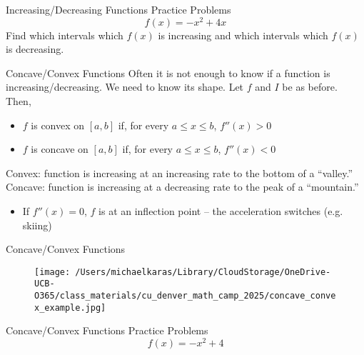 \documentclass[aspectratio=169]{beamer}
\begin{document}
\begin{frame}{Increasing/Decreasing Functions Practice Problems}\label{main1}
	\vspace{-4cm}
     \[
    f(x) = -x^2 + 4x
    \]
    Find which intervals which \( f(x) \) is increasing and which intervals which \( f(x) \) is decreasing.
\end{frame}

\begin{frame}{Concave/Convex Functions}\label{main1}
    Often it is not enough to know if a function is increasing/decreasing. We need to know its shape. Let $f$ and $I$ be as before. Then,
    \begin{itemize}
        \item $f$ is convex on $[a, b]$ if, for every $a \leq x \leq b$, $f''(x) > 0$
        \item $f$ is concave on $[a, b]$ if, for every $a \leq x \leq b$, $f''(x) < 0$
    \end{itemize}
    Convex: function is increasing at an increasing rate to the bottom of a “valley.” Concave: function is increasing at a decreasing rate to the peak of a “mountain.”
    \begin{itemize}
        \item If $f''(x) = 0$, $f$ is at an inflection point – the acceleration switches (e.g. skiing)
    \end{itemize}
\end{frame}

\begin{frame}{Concave/Convex Functions}\label{main1}
    \begin{figure}
        \centering
        \texttt{[image: /Users/michaelkaras/Library/CloudStorage/OneDrive-UCB-O365/class\_materials/cu\_denver\_math\_camp\_2025/concave\_convex\_example.jpg]}
    \end{figure}
\end{frame}

\begin{frame}{Concave/Convex Functions Practice Problems}\label{main1}
	\vspace{-4cm}
     \[
    f(x) = -x^2 + 4
    \]
\end{frame}
\end{document}
